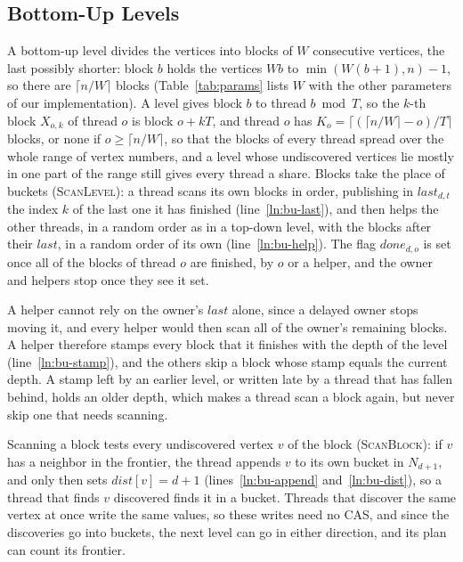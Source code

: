 \subsection{Bottom-Up Levels}
\label{sec:do-bu}

A bottom-up level divides the vertices into blocks of $W$ consecutive vertices, the last possibly shorter: block $b$ holds the vertices $Wb$ to $\min(W(b+1), n) - 1$, so there are $\lceil n / W \rceil$ blocks (Table~\ref{tab:params} lists $W$ with the other parameters of our implementation). A level gives block $b$ to thread $b \bmod T$, so the $k$-th block $X_{o,k}$ of thread $o$ is block $o + kT$, and thread $o$ has $K_o = \lceil (\lceil n/W \rceil - o) / T \rceil$ blocks, or none if $o \geq \lceil n/W \rceil$, so that the blocks of every thread spread over the whole range of vertex numbers, and a level whose undiscovered vertices lie mostly in one part of the range still gives every thread a share. Blocks take the place of buckets (\textsc{ScanLevel}): a thread scans its own blocks in order, publishing in $\mathit{last}_{d,t}$ the index $k$ of the last one it has finished (line~\ref{ln:bu-last}), and then helps the other threads, in a random order as in a top-down level, with the blocks after their $\mathit{last}$, in a random order of its own (line~\ref{ln:bu-help}). The flag $\mathit{done}_{d,o}$ is set once all of the blocks of thread $o$ are finished, by $o$ or a helper, and the owner and helpers stop once they see it set.

A helper cannot rely on the owner's $\mathit{last}$ alone, since a delayed owner stops moving it, and every helper would then scan all of the owner's remaining blocks. A helper therefore stamps every block that it finishes with the depth of the level (line~\ref{ln:bu-stamp}), and the others skip a block whose stamp equals the current depth. A stamp left by an earlier level, or written late by a thread that has fallen behind, holds an older depth, which makes a thread scan a block again, but never skip one that needs scanning.

Scanning a block tests every undiscovered vertex $v$ of the block (\textsc{ScanBlock}): if $v$ has a neighbor in the frontier, the thread appends $v$ to its own bucket in $N_{d+1}$, and only then sets $\mathit{dist}[v] = d+1$ (lines~\ref{ln:bu-append} and~\ref{ln:bu-dist}), so a thread that finds $v$ discovered finds it in a bucket. Threads that discover the same vertex at once write the same values, so these writes need no CAS, and since the discoveries go into buckets, the next level can go in either direction, and its plan can count its frontier.


